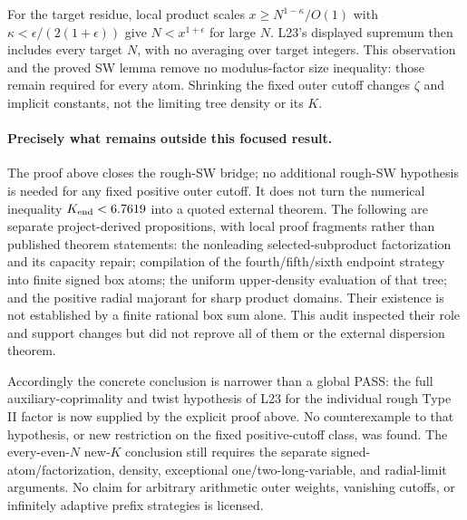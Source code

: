 For the target residue, local product scales
$x\ge N^{1-\kappa}/O(1)$ with
$\kappa<\epsilon/(2(1+\epsilon))$ give $N<x^{1+\epsilon}$ for large
$N$. L23's displayed supremum then includes every target $N$, with no
averaging over target integers. This observation and the proved SW
lemma remove no modulus-factor size inequality: those remain required
for every atom. Shrinking the fixed outer cutoff changes $\zeta$ and
implicit constants, not the limiting tree density or its $K$.

\paragraph{Precisely what remains outside this focused result.}
The proof above closes the rough-SW bridge; no additional rough-SW
hypothesis is needed for any fixed positive outer cutoff. It does not
turn the numerical inequality $K_{\rm end}<6.7619$ into a quoted
external theorem. The following are separate project-derived
propositions, with local proof fragments rather than published theorem
statements: the nonleading selected-subproduct factorization and its
capacity repair; compilation of the fourth/fifth/sixth endpoint strategy
into finite signed box atoms; the uniform upper-density evaluation of
that tree; and the positive radial majorant for sharp product domains.
Their existence is not established by a finite rational box sum alone.
This audit inspected their role and support changes but did not reprove
all of them or the external dispersion theorem.

Accordingly the concrete conclusion is narrower than a global PASS:
the full auxiliary-coprimality and twist hypothesis of L23 for the
individual rough Type II factor is now supplied by the explicit proof
above. No counterexample to that hypothesis, or new restriction on the
fixed positive-cutoff class, was found. The every-even-$N$ new-$K$
conclusion still requires the separate signed-atom/factorization,
density, exceptional one/two-long-variable, and radial-limit arguments.
No claim for arbitrary arithmetic outer weights, vanishing cutoffs,
or infinitely adaptive prefix strategies is licensed.
